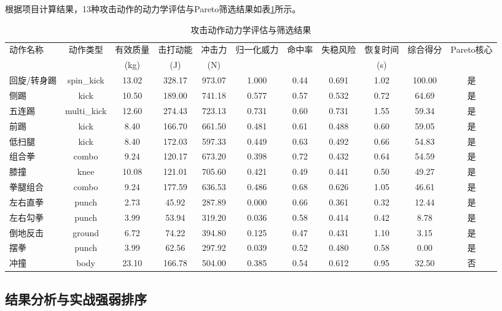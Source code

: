 \documentclass[a4paper,12pt]{article}
\numberwithin{equation}{section}
\numberwithin{table}{section}
\numberwithin{figure}{section}
\begin{document}
根据项目计算结果，13种攻击动作的动力学评估与Pareto筛选结果如表\ref{tab:attack_eval}所示。

\begin{table}[H]
    \centering
    \caption{攻击动作动力学评估与筛选结果}
    \label{tab:attack_eval}
    \small
    \begin{tabular}{lcccccccccc}
        \toprule
        动作名称 & 动作类型 & 有效质量 & 击打动能 & 冲击力 & 归一化威力 & 命中率 & 失稳风险 & 恢复时间 & 综合得分 & Pareto核心 \\
         & & (kg) & (J) & (N) & & & & (s) & & \\
        \midrule
        回旋/转身踢 & spin\_kick & 13.02 & 328.17 & 973.07 & 1.000 & 0.44 & 0.691 & 1.02 & 100.00 & 是 \\
        侧踢 & kick & 10.50 & 189.00 & 741.18 & 0.577 & 0.57 & 0.532 & 0.72 & 64.69 & 是 \\
        五连踢 & multi\_kick & 12.60 & 274.43 & 723.13 & 0.731 & 0.60 & 0.731 & 1.55 & 59.34 & 是 \\
        前踢 & kick & 8.40 & 166.70 & 661.50 & 0.481 & 0.61 & 0.488 & 0.60 & 59.05 & 是 \\
        低扫腿 & kick & 8.40 & 172.03 & 597.33 & 0.449 & 0.63 & 0.492 & 0.66 & 54.83 & 是 \\
        组合拳 & combo & 9.24 & 120.17 & 673.20 & 0.398 & 0.72 & 0.432 & 0.64 & 54.59 & 是 \\
        膝撞 & knee & 10.08 & 121.01 & 705.60 & 0.421 & 0.49 & 0.441 & 0.50 & 49.27 & 是 \\
        拳腿组合 & combo & 9.24 & 177.59 & 636.53 & 0.486 & 0.68 & 0.626 & 1.05 & 46.61 & 是 \\
        左右直拳 & punch & 2.73 & 45.92 & 287.89 & 0.000 & 0.66 & 0.361 & 0.32 & 12.44 & 是 \\
        左右勾拳 & punch & 3.99 & 53.94 & 319.20 & 0.036 & 0.58 & 0.414 & 0.42 & 8.78 & 是 \\
        倒地反击 & ground & 6.72 & 74.22 & 394.80 & 0.125 & 0.47 & 0.431 & 1.10 & 3.15 & 是 \\
        摆拳 & punch & 3.99 & 62.56 & 297.92 & 0.039 & 0.52 & 0.480 & 0.58 & 0.00 & 是 \\
        冲撞 & body & 23.10 & 166.78 & 504.00 & 0.385 & 0.54 & 0.612 & 0.95 & 32.50 & 否 \\
        \bottomrule
    \end{tabular}
\end{table}

\subsection{结果分析与实战强弱排序}
\end{document}
